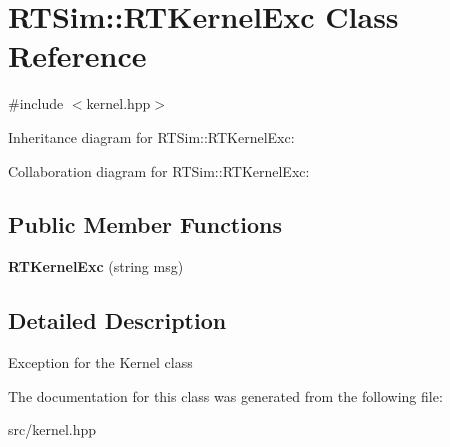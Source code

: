 \hypertarget{classRTSim_1_1RTKernelExc}{}\section{R\+T\+Sim\+:\+:R\+T\+Kernel\+Exc Class Reference}
\label{classRTSim_1_1RTKernelExc}


{\ttfamily \#include $<$kernel.\+hpp$>$}



Inheritance diagram for R\+T\+Sim\+:\+:R\+T\+Kernel\+Exc\+:


Collaboration diagram for R\+T\+Sim\+:\+:R\+T\+Kernel\+Exc\+:
\subsection*{Public Member Functions}
\begin{DoxyCompactItemize}
\item 
{\bfseries R\+T\+Kernel\+Exc} (string msg)\hypertarget{classRTSim_1_1RTKernelExc_a29bc4b2600901944bf76595441b953cf}{}\label{classRTSim_1_1RTKernelExc_a29bc4b2600901944bf76595441b953cf}

\end{DoxyCompactItemize}


\subsection{Detailed Description}
Exception for the Kernel class 

The documentation for this class was generated from the following file\+:\begin{DoxyCompactItemize}
\item 
src/kernel.\+hpp\end{DoxyCompactItemize}
